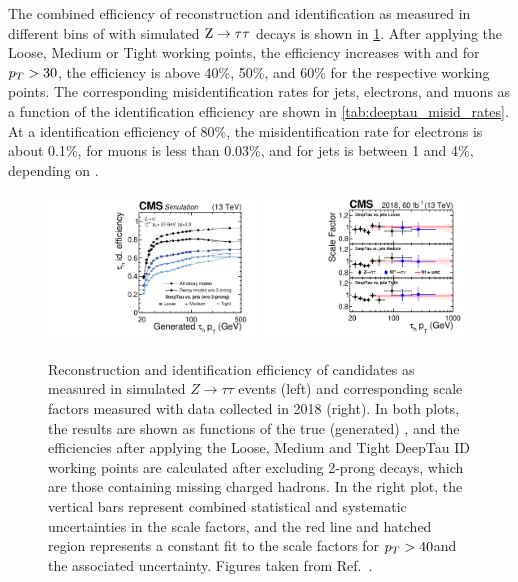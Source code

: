 The combined efficiency of \tauh reconstruction and identification as measured in different bins of \tauh \pt with simulated $\mathrm{Z}\to\tau\tau$ decays is shown in \cref{fig:tau_reco_id_eff}. After applying the Loose, Medium or Tight \Djet working points, the efficiency increases with \tauh \pt and for $p_T > 30$\GeV, the efficiency is above 40\%, 50\%, and 60\% for the respective working points. The corresponding misidentification rates for jets, electrons, and muons as a function of the \tauh identification efficiency are shown in \cref{tab:deeptau_misid_rates}. At a \tauh identification efficiency of 80\%, the misidentification rate for electrons is about 0.1\%, for muons is less than 0.03\%, and for jets is between 1 and 4\%, depending on \tauh \pt.

\begin{figure}
  \centering
  \includegraphics[width=0.49\textwidth]{Figures/Detector/CMS/tau_reco_id_eff.pdf}
  \includegraphics[width=0.49\textwidth]{Figures/Detector/CMS/tau_id_scale_factor.pdf}
  \caption[\tauh Reconstruction and Identification Efficiency]{Reconstruction and identification efficiency of \tauh candidates as measured in simulated $Z\to\tau\tau$ events (left) and corresponding scale factors measured with data collected in 2018 (right). In both plots, the results are shown as functions of the true (generated) \tauh \pt, and the efficiencies after applying the Loose, Medium and Tight DeepTau ID working points are calculated after excluding 2-prong decays, which are those containing missing charged hadrons. In the right plot, the vertical bars represent combined statistical and systematic uncertainties in the scale factors, and the red line and hatched region represents a constant fit to the scale factors for $p_T > 40$\GeV and the associated uncertainty. Figures taken from Ref.~\cite{CMS:2022prd}.}\label{fig:tau_reco_id_eff}
\end{figure}

